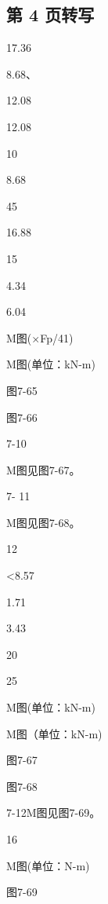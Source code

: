 \subsection*{第 4 页转写}
17.36

8.68、

12.08

12.08

10

8.68

45

16.88

15

4.34

6.04

M图($\times$Fp/41)

M图(单位：kN-m)

图7-65

图7-66

7-10

M图见图7-67。

7- 11

M图见图7-68。

12

<8.57

1.71

3.43

20

25

M图(单位：kN-m)

M图（单位：kN-m)

图7-67

图7-68

7-12M图见图7-69。

16

M图(单位：N-m)

图7-69

